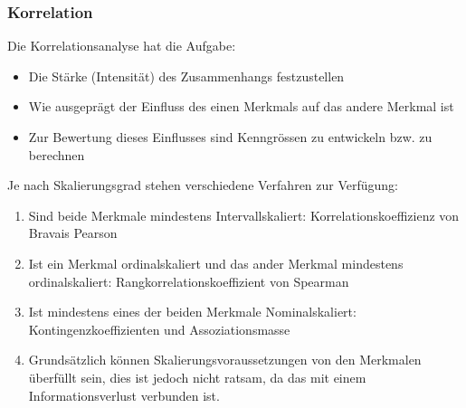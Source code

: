 \subsubsection{Korrelation}
Die Korrelationsanalyse hat die Aufgabe:
\begin{itemize}
\item Die Stärke (Intensität) des Zusammenhangs festzustellen
\item Wie ausgeprägt der Einfluss des einen Merkmals auf das andere Merkmal ist
\item Zur Bewertung dieses Einflusses sind Kenngrössen zu entwickeln bzw. zu berechnen
\end{itemize}
Je nach Skalierungsgrad stehen verschiedene Verfahren zur Verfügung:
\begin{enumerate}
\item Sind beide Merkmale mindestens Intervallskaliert:
\subitem Korrelationskoeffizienz von Bravais Pearson
\item Ist ein Merkmal ordinalskaliert und das ander Merkmal mindestens ordinalskaliert:
\subitem Rangkorrelationskoeffizient von Spearman
\item Ist mindestens eines der beiden Merkmale Nominalskaliert:
\subitem Kontingenzkoeffizienten und Assoziationsmasse
\item Grundsätzlich können Skalierungsvoraussetzungen von den Merkmalen überfüllt sein, dies ist jedoch nicht ratsam, da das mit einem Informationsverlust verbunden ist.
\end{enumerate}
